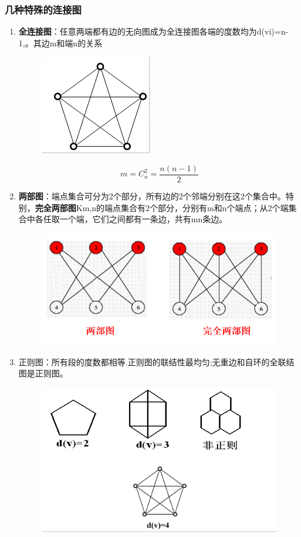 \subsubsection{几种特殊的连接图}
\begin{enumerate}
	\item \textbf{全连接图}：任意两端都有边的无向图成为全连接图各端的度数均为d(vi)=n-1,。其边m和端n的关系
	\begin{figure}[H]
		\centering
		\includegraphics[width=0.3\linewidth]{figures/screenshot046}
		\caption{}
		\label{fig:screenshot046}
	\end{figure}
	
	\begin{equation}\label{key}
	m = C_n^2 = \frac{n(n-1)}{2}
	\end{equation}
	\item \textbf{两部图}：端点集合可分为2个部分，所有边的2个邻端分别在这2个集合中。特别，\textbf{完全两部图}Km,n的端点集合有2个部分，分别有m和n个端点；从2个端集合中各任取一个端，它们之间都有一条边，共有mn条边。
	\begin{figure}[H]
		\centering
		\includegraphics[width=0.7\linewidth]{figures/screenshot047}
		\caption{}
		\label{fig:screenshot047}
	\end{figure}
	
	\item 正则图：所有段的度数都相等.正则图的联结性最均匀;无重边和自环的全联结图是正则图。
	\begin{figure}[H]
		\centering
		\includegraphics[width=0.7\linewidth]{figures/screenshot048}
		\caption{}
		\label{fig:screenshot048}
	\end{figure}
	

\end{enumerate}
